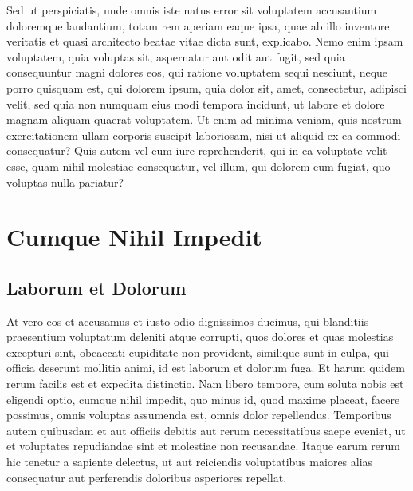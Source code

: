 \documentclass[a4paper,11pt,twoside,onecolumn,final,openright]{book}
\begin{document}
Sed ut perspiciatis, unde omnis iste natus error sit voluptatem accusantium doloremque laudantium, totam rem aperiam eaque ipsa, quae ab illo inventore veritatis et quasi architecto beatae vitae dicta sunt, explicabo. Nemo enim ipsam voluptatem, quia voluptas sit, aspernatur aut odit aut fugit, sed quia consequuntur magni dolores eos, qui ratione voluptatem sequi nesciunt, neque porro quisquam est, qui dolorem ipsum, quia dolor sit, amet, consectetur, adipisci velit, sed quia non numquam eius modi tempora incidunt, ut labore et dolore magnam aliquam quaerat voluptatem. Ut enim ad minima veniam, quis nostrum exercitationem ullam corporis suscipit laboriosam, nisi ut aliquid ex ea commodi consequatur? Quis autem vel eum iure reprehenderit, qui in ea voluptate velit esse, quam nihil molestiae consequatur, vel illum, qui dolorem eum fugiat, quo voluptas nulla pariatur?

\newpage
\thispagestyle{empty}



\part{Cumque Nihil Impedit}
\thispagestyle{empty}
\chapter*{Laborum et Dolorum}
\thispagestyle{empty}

At vero eos et accusamus et iusto odio dignissimos ducimus, qui blanditiis praesentium voluptatum deleniti atque corrupti, quos dolores et quas molestias excepturi sint, obcaecati cupiditate non provident, similique sunt in culpa, qui officia deserunt mollitia animi, id est laborum et dolorum fuga. Et harum quidem rerum facilis est et expedita distinctio. Nam libero tempore, cum soluta nobis est eligendi optio, cumque nihil impedit, quo minus id, quod maxime placeat, facere possimus, omnis voluptas assumenda est, omnis dolor repellendus. Temporibus autem quibusdam et aut officiis debitis aut rerum necessitatibus saepe eveniet, ut et voluptates repudiandae sint et molestiae non recusandae. Itaque earum rerum hic tenetur a sapiente delectus, ut aut reiciendis voluptatibus maiores alias consequatur aut perferendis doloribus asperiores repellat.
\end{document}

